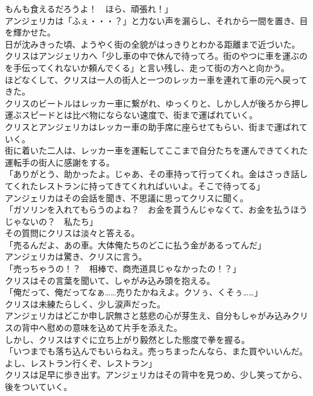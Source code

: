 \documentclass[b5j,10pt,openany]{jsbook}
\begin{document}
もんも食えるだろうよ！　ほら、頑張れ！」\\アンジェリカは「ふぇ・・・？」と力ない声を漏らし、それから一間を置き、目を輝かせた。\\日が沈みきった頃、ようやく街の全貌がはっきりとわかる距離まで近づいた。\\クリスはアンジェリカへ「少し車の中で休んで待ってろ。街のやつに車を運ぶのを手伝ってくれないか頼んでくる」と言い残し、走って街の方へと向かう。\\ほどなくして、クリスは一人の街人と一つのレッカー車を連れて車の元へ戻ってきた。\\クリスのビートルはレッカー車に繋がれ、ゆっくりと、しかし人が後ろから押し運ぶスピードとは比べ物にならない速度で、街まで運ばれていく。\\クリスとアンジェリカはレッカー車の助手席に座らせてもらい、街まで運ばれていく。\\街に着いた二人は、レッカー車を運転してここまで自分たちを運んできてくれた運転手の街人に感謝をする。\\「ありがとう、助かったよ。じゃあ、その車持って行ってくれ。金はさっき話してくれたレストランに持ってきてくれればいいよ。そこで待ってる」\\アンジェリカはその会話を聞き、不思議に思ってクリスに聞く。\\「ガソリンを入れてもらうのよね？　お金を貰うんじゃなくて、お金を払うほうじゃないの？　私たち」\\その質問にクリスは淡々と答える。\\「売るんだよ、あの車。大体俺たちのどこに払う金があるってんだ」\\アンジェリカは驚き、クリスに言う。\\「売っちゃうの！？　相棒で、商売道具じゃなかったの！？」\\クリスはその言葉を聞いて、しゃがみ込み頭を抱える。\\「俺だって、俺だってなぁ\ldots{}\ldots{}売りたかねえよ。クソぅ、くそぅ\ldots{}\ldots{}」\\クリスは未練たらしく、少し涙声だった。\\アンジェリカはどこか申し訳無さと慈悲の心が芽生え、自分もしゃがみ込みクリスの背中へ慰めの意味を込めて片手を添えた。\\しかし、クリスはすぐに立ち上がり毅然とした態度で拳を握る。\\「いつまでも落ち込んでもいらねえ。売っちまったんなら、また買やいいんだ。よし、レストラン行くぞ、レストラン」\\クリスは足早に歩き出す。アンジェリカはその背中を見つめ、少し笑ってから、後をついていく。
\end{document}
